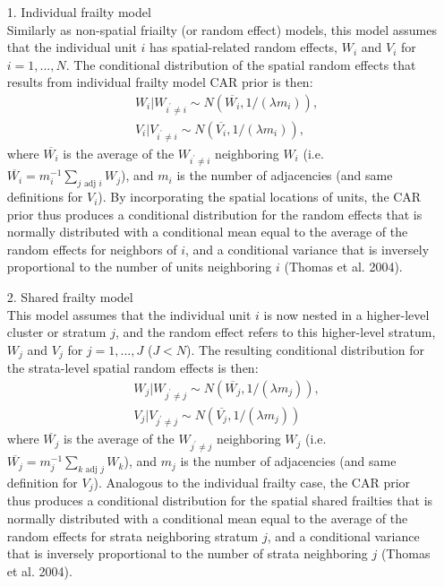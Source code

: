 \documentclass[a4paper, 12pt]{article}
\begin{document}
\begin{itemize}
	\item [1.] Individual frailty model\\
	Similarly as non-spatial friailty (or random effect) models, this model assumes that the individual unit $i$ has spatial-related random effects, $W_i$ and $V_i$ for $i = 1,...,N$. The conditional distribution of the spatial random effects that results from individual frailty model CAR prior is then:
\begin{equation}
\begin{aligned}
&W_i|W_{i^\prime \neq i} \sim N(\overline{W_i}, 1/(\lambda m_i)),\\
&V_i|V_{i^\prime \neq i} \sim N(\overline{V_i}, 1/(\lambda m_i)),
\end{aligned}
\end{equation}
where $\overline{W_i}$ is the average of the $W_{i^\prime \neq i}$ neighboring $W_i$ (i.e. $\overline{W_i}=m_i^{-1}\sum_{j \mbox{ adj } i}W_j$), and $m_i$ is the number of adjacencies (and same definitions for $V_i$). By incorporating the spatial locations of units, the CAR prior thus produces a conditional
distribution for the random effects that is normally distributed with a conditional mean
equal to the average of the random effects for neighbors of $i$, and a conditional variance that
is inversely proportional to the number of units neighboring $i$ (Thomas et al. 2004).
	\item [2.] Shared frailty model\\
	This model assumes that the individual unit $i$ is now nested in a higher-level cluster or stratum	$j$, and the random effect refers to this higher-level stratum, $W_j$ and $V_j$ for $j=1,...,J$ ($J < N$). The resulting conditional distribution for the strata-level spatial random effects is then:
	\begin{equation}
	\begin{aligned}
	&W_j|W_{j^\prime \neq j} \sim N(\overline{W_j}, 1/(\lambda m_j)),\\
	&	V_j|V_{j^\prime \neq j} \sim N(\overline{V_j}, 1/(\lambda m_j))
	\end{aligned}
	\end{equation}
	where $\overline{W_j}$ is the average of the $W_{j^\prime \neq j}$ neighboring $W_j$ (i.e. $\overline{W_j}=m_j^{-1}\sum_{k \mbox{ adj } j}W_k$), and $m_j$ is the number of adjacencies (and same definition for $V_j$). Analogous to the individual frailty case, the CAR prior thus produces a conditional distribution
for the spatial shared frailties that is normally distributed with a conditional mean
equal to the average of the random effects for strata neighboring stratum $j$, and a conditional
variance that is inversely proportional to the number of strata neighboring $j$ (Thomas et al.
2004).\\
\end{itemize} 
\end{document}
